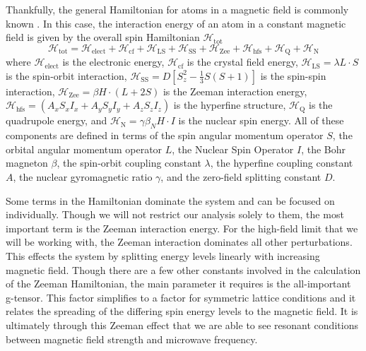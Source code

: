 \documentclass[oneside, astronomy, noacknowlegments]{BYUPhys}
\begin{document}
Thankfully, the general Hamiltonian for atoms in a magnetic field is commonly known \cite{RefWorks:doc:58929c15e4b0228a29292c58} \cite{RefWorks:doc:589295bde4b0d4c09201f692}. In this case, the interaction energy of an atom in a constant magnetic field is given by the overall spin Hamiltonian $\mathcal{H}_{\text{tot}}$ \cite{RefWorks:doc:589293f5e4b0dec22aee39de} $$\mathcal{H}_{\text{tot}} = \mathcal{H}_{\text{elect}} + \mathcal{H}_{\text{cf}} + \mathcal{H}_{\text{LS}} + \mathcal{H}_{\text{SS}} + \mathcal{H}_{\text{Zee}} + \mathcal{H}_{\text{hfs}} + \mathcal{H}_{\text{Q}} + \mathcal{H}_{\text{N}}$$ where $\mathcal{H}_{\text{elect}}$ is the electronic energy, $\mathcal{H}_{\text{cf}}$ is the crystal field energy, $\mathcal{H}_{\text{LS}} = \lambda L \cdot S$ is the spin-orbit interaction, $\mathcal{H}_{\text{SS}} = D \left[ S_{z}^{2} - \frac{1}{3} S (S+1) \right]$ is the spin-spin interaction, $\mathcal{H}_{\text{Zee}} = \beta H \cdot (L+2S)$ is the Zeeman interaction energy, $\mathcal{H}_{\text{hfs}} = \left(A_xS_xI_x + A_yS_yI_y + A_zS_zI_z\right)$ is the hyperfine structure, $\mathcal{H}_{\text{Q}}$ is the quadrupole energy, and $\mathcal{H}_{\text{N}} = \gamma \beta_{N} H \cdot I$ is the nuclear spin energy. All of these components are defined in terms of the spin angular momentum operator $S$, the orbital angular momentum operator $L$, the Nuclear Spin Operator $I$, the Bohr magneton $\beta$, the spin-orbit coupling constant $\lambda$, the hyperfine coupling constant $A$, the nuclear gyromagnetic ratio $\gamma$, and the zero-field splitting constant $D$.

Some terms in the Hamiltonian dominate the system and can be focused on individually. Though we will not restrict our analysis solely to them, the most important term is the Zeeman interaction energy. For the high-field limit that we will be working with, the Zeeman interaction dominates all other perturbations. This effects the system by splitting energy levels linearly with increasing magnetic field. Though there are a few other constants involved in the calculation of the Zeeman Hamiltonian, the main parameter it requires is the all-important g-tensor. This factor simplifies to a factor for symmetric lattice conditions and it relates the spreading of the differing spin energy levels to the magnetic field. It is ultimately through this Zeeman effect that we are able to see resonant conditions between magnetic field strength and microwave frequency.
\end{document}
